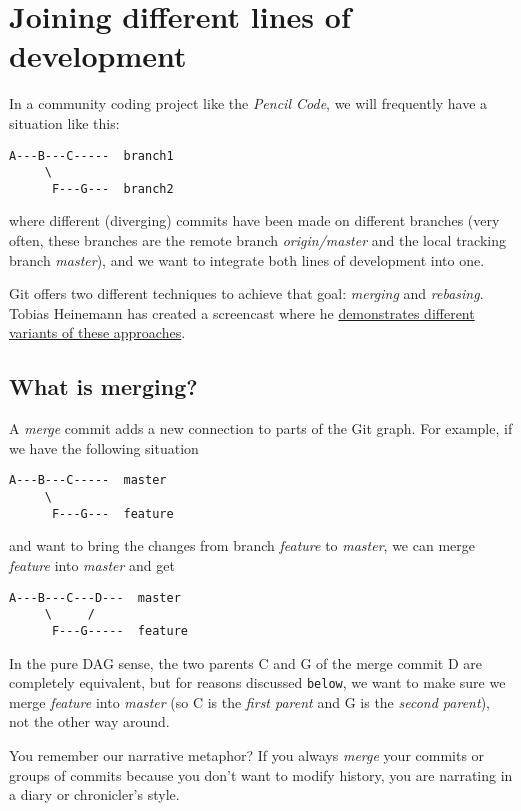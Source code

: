 \documentclass[12pt,pdftex]{article}
\begin{document}
\section{Joining different lines of development}
\label{sec-4}
\label{Section:Joining-lines-of-development}

In a community coding project like the \emph{Pencil Code}, we will
frequently have a situation like this:
\begin{verbatim}
A---B---C-----  branch1
     \
      F---G---  branch2
\end{verbatim}
where different (diverging) commits have been made on different
branches (very often, these branches are the remote branch
\emph{origin/master} and the local tracking branch \emph{master}), and we want to
integrate both lines of development into one.

Git offers two different techniques to achieve that goal: \emph{merging} and
\emph{rebasing}.
Tobias Heinemann has created a screencast where he
\href{https://asciinema.org/a/dauj562l4uwr7bpyohqyewkj5}{demonstrates different variants of these approaches}.


\subsection{What is merging?}
\label{sec-4-1}
\label{Merge}

A \emph{merge} commit adds a new connection to parts of the Git graph.
For example, if we have the following situation
\begin{verbatim}
A---B---C-----  master
     \
      F---G---  feature
\end{verbatim}
and want to bring the changes from branch \emph{feature} to \emph{master}, we
can merge \emph{feature} into \emph{master} and get
\begin{verbatim}
A---B---C---D---  master
     \     /
      F---G-----  feature
\end{verbatim}

In the pure DAG sense, the two parents C and G of the merge commit D
are completely equivalent, but for reasons discussed \texttt{below}, we want to
make sure we merge \emph{feature} into \emph{master} (so C is the \emph{first parent}
and G is the \emph{second parent}), not the other way around.

You remember our narrative metaphor?
If you always \emph{merge} your commits or groups of commits because you
don't want to modify history, you are narrating in a diary or
chronicler's style.
\end{document}
